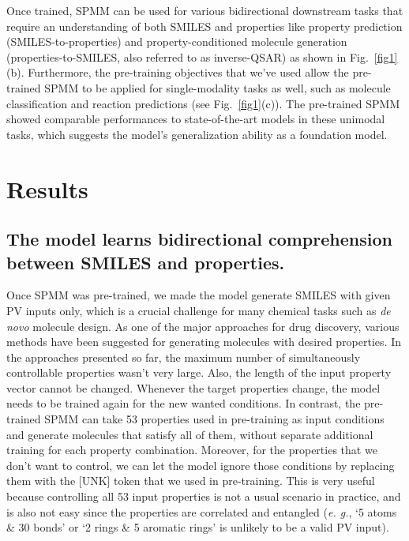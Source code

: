 \documentclass{nature_meth}
\newcommand{\1}{\blmath{1}}
\newcommand{\0}{\blmath{0}}
\begin{document}
Once trained, SPMM can be used for various bidirectional downstream tasks that require an understanding of both SMILES and properties like property prediction (SMILES-to-properties) and property-conditioned molecule generation (properties-to-SMILES, also referred to as inverse-QSAR\cite{inverseQSAR}) as shown in Fig.~\ref{fig1}(b). Furthermore, the pre-training objectives that we've used allow the pre-trained SPMM to be applied for single-modality tasks as well, such as molecule classification and reaction predictions (see Fig.~\ref{fig1}(c)). The pre-trained SPMM showed comparable performances to state-of-the-art models in these unimodal tasks, which suggests the model's generalization ability as a foundation model.





\section*{Results}
\subsection{The model learns bidirectional comprehension between SMILES and properties.}
Once SPMM was pre-trained, we made the model generate SMILES with given PV inputs only,
which is a crucial challenge for many chemical tasks such as {\em de novo} molecule design. As one of the major approaches for drug discovery, various methods have been suggested for generating molecules with desired properties\cite{denovo_transformer,lcj_denovo1,denovo_rl,lcj_denovo2}. In the approaches presented so far, the maximum number of simultaneously controllable properties wasn't very large. Also, the length of the input property vector cannot be changed. Whenever the target properties change, the model needs to be trained again for the new wanted conditions. In contrast, the pre-trained SPMM can take 53 properties used in pre-training as input conditions and generate molecules that satisfy all of them, without separate additional training for each property combination. Moreover, for the properties that we don't want to control, we can let the model ignore those conditions by replacing them with the [UNK] token that we used in pre-training. This is very useful because controlling all 53 input properties is not a usual scenario in practice, and is also not easy since the properties are correlated and entangled (\textit{e. g.}, `5 atoms \& 30 bonds' or `2 rings \& 5 aromatic rings' is unlikely to be a valid PV input).
\end{document}
